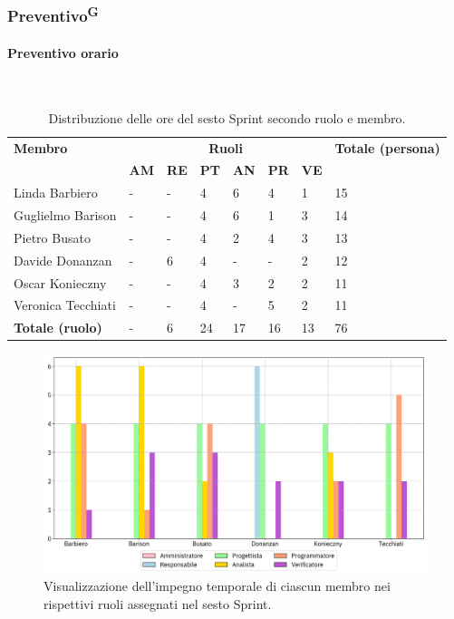 \documentclass[8pt]{article}
\newcommand{\glossterm}[1]{#1\textsuperscript{G}} %
\newcommand{\subsubsubsection}[1]{\paragraph{#1}\mbox{}\\}
\begin{document}
\subsubsection{\glossterm{Preventivo}}
\subsubsubsection{Preventivo orario}
\begin{table}[ht!]
	\centering
	\begin{tabular}{p{4cm} p{1cm} p{1cm} p{1cm} p{1cm} p{1cm} p{1cm} p{3cm}}
		\toprule
        \textbf{Membro} & \multicolumn{6}{c}{\textbf{Ruoli}} & \textbf{Totale (persona)}\\
		& \textbf{AM} & \textbf{RE} & \textbf{PT} & \textbf{AN} & \textbf{PR} & \textbf{VE}\\
		\midrule
        Linda Barbiero          & -     & -     & 4     & 6     & 4     & 1     & 15 \\
        Guglielmo Barison       & -     & -     & 4     & 6     & 1     & 3     & 14 \\
        Pietro Busato           & -     & -     & 4     & 2     & 4     & 3     & 13 \\
        Davide Donanzan         & -     & 6     & 4     & -     & -     & 2     & 12 \\
        Oscar Konieczny         & -     & -     & 4     & 3     & 2     & 2     & 11 \\
        Veronica Tecchiati      & -     & -     & 4     & -     & 5     & 2     & 11 \\
        \bottomrule
        \textbf{Totale (ruolo)} & -     & 6     & 24    & 17    & 16    & 13    & 76 \\
	\end{tabular}
	\caption{Distribuzione delle ore del sesto Sprint secondo ruolo e membro.}
	\label{table:Distribuzione delle ore del sesto Sprint secondo ruolo e membro}
\end{table}
\begin{figure}[ht!]
    \centering
    \includegraphics[width=15cm]{./images_pdp/istogramma_periodo_6.png}
    \caption{Visualizzazione dell'impegno temporale di ciascun membro nei rispettivi ruoli assegnati
    nel sesto Sprint.}
    \label{figure:Visualizzazione dell'impegno temporale di ciascun membro nei rispettivi ruoli
    assegnati nel sesto Sprint}
\end{figure}
\end{document}
